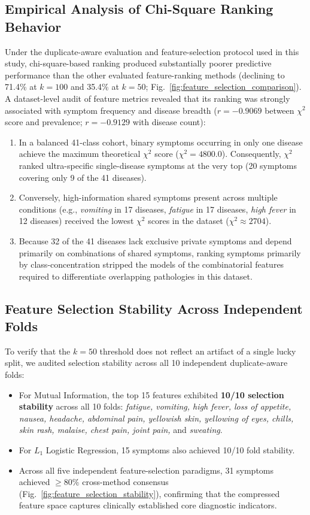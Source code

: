 \subsection{Empirical Analysis of Chi-Square Ranking Behavior}
Under the duplicate-aware evaluation and feature-selection protocol used in this study, chi-square-based ranking produced substantially poorer predictive performance than the other evaluated feature-ranking methods (declining to 71.4\% at $k=100$ and 35.4\% at $k=50$; Fig.~\ref{fig:feature_selection_comparison}). A dataset-level audit of feature metrics revealed that its ranking was strongly associated with symptom frequency and disease breadth ($r = -0.9069$ between $\chi^2$ score and prevalence; $r = -0.9129$ with disease count):
\begin{enumerate}
    \item In a balanced 41-class cohort, binary symptoms occurring in only one disease achieve the maximum theoretical $\chi^2$ score ($\chi^2 = 4800.0$). Consequently, $\chi^2$ ranked ultra-specific single-disease symptoms at the very top (20 symptoms covering only 9 of the 41 diseases).
    \item Conversely, high-information shared symptoms present across multiple conditions (e.g., \emph{vomiting} in 17 diseases, \emph{fatigue} in 17 diseases, \emph{high fever} in 12 diseases) received the lowest $\chi^2$ scores in the dataset ($\chi^2 \approx 2704$).
    \item Because 32 of the 41 diseases lack exclusive private symptoms and depend primarily on combinations of shared symptoms, ranking symptoms primarily by class-concentration stripped the models of the combinatorial features required to differentiate overlapping pathologies in this dataset.
\end{enumerate}

\subsection{Feature Selection Stability Across Independent Folds}
To verify that the $k=50$ threshold does not reflect an artifact of a single lucky split, we audited selection stability across all 10 independent duplicate-aware folds:
\begin{itemize}
    \item For Mutual Information, the top 15 features exhibited \textbf{10/10 selection stability} across all 10 folds: \emph{fatigue, vomiting, high fever, loss of appetite, nausea, headache, abdominal pain, yellowish skin, yellowing of eyes, chills, skin rash, malaise, chest pain, joint pain,} and \emph{sweating}.
    \item For $L_1$ Logistic Regression, 15 symptoms also achieved 10/10 fold stability.
    \item Across all five independent feature-selection paradigms, 31 symptoms achieved $\ge 80\%$ cross-method consensus (Fig.~\ref{fig:feature_selection_stability}), confirming that the compressed feature space captures clinically established core diagnostic indicators.
\end{itemize}

